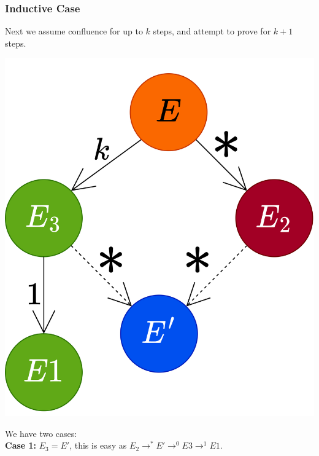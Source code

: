 \subsubsection*{Inductive Case}
Next we assume confluence for up to $k$ steps, and attempt to prove for $k+1$ steps.
\begin{center}
	\includegraphics[scale=0.1]{structural_induction/images/confluence_inductive_case.drawio.png}
\end{center}
We have two cases:
\\ \textbf{Case 1:} $E_3 = E'$, this is easy as $E_2 \to^* E' \to^0 E3 \to^1 E1$.
